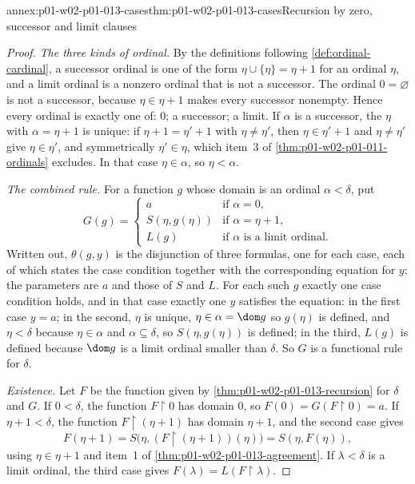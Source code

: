 \begin{annexitem}{annex:p01-w02-p01-013-cases}{thm:p01-w02-p01-013-cases}{Recursion by zero, successor and limit clauses}
\begin{proof}
\emph{The three kinds of ordinal.} By the definitions following
\cref{def:ordinal-cardinal}, a successor ordinal is one of the form
\(\eta\cup\{\eta\}=\eta+1\) for an ordinal \(\eta\), and a limit ordinal is a
nonzero ordinal that is not a successor. The ordinal \(0=\varnothing\) is not
a successor, because \(\eta\in\eta+1\) makes every successor nonempty. Hence
every ordinal is exactly one of: \(0\); a successor; a limit. If \(\alpha\)
is a successor, the \(\eta\) with \(\alpha=\eta+1\) is unique: if
\(\eta+1=\eta'+1\) with \(\eta\ne\eta'\), then \(\eta\in\eta'+1\) and
\(\eta\ne\eta'\) give \(\eta\in\eta'\), and symmetrically
\(\eta'\in\eta\), which item~3 of \cref{thm:p01-w02-p01-011-ordinals}
excludes. In that case \(\eta\in\alpha\), so \(\eta<\alpha\).

\emph{The combined rule.} For a function \(g\) whose domain is an ordinal
\(\alpha<\delta\), put
\[
  G(g)=
  \begin{cases}
    a & \text{if }\alpha=0,\\
    S(\eta,g(\eta)) & \text{if }\alpha=\eta+1,\\
    L(g) & \text{if }\alpha\text{ is a limit ordinal.}
  \end{cases}
\]
Written out, \(\theta(g,y)\) is the disjunction of three formulas, one for
each case, each of which states the case condition together with the
corresponding equation for \(y\); the parameters are \(a\) and those of
\(S\) and \(L\). For each such \(g\) exactly one case condition holds, and
in that case exactly one \(y\) satisfies the equation: in the first case
\(y=a\); in the second, \(\eta\) is unique, \(\eta\in\alpha=\dom g\) so
\(g(\eta)\) is defined, and \(\eta<\delta\) because \(\eta\in\alpha\) and
\(\alpha\subseteq\delta\), so \(S(\eta,g(\eta))\) is defined; in the third,
\(L(g)\) is defined because \(\dom g\) is a limit ordinal smaller than
\(\delta\). So \(G\) is a functional rule for \(\delta\).

\emph{Existence.} Let \(F\) be the function given by
\cref{thm:p01-w02-p01-013-recursion} for \(\delta\) and \(G\). If
\(0<\delta\), the function \(F\mathbin{\upharpoonright}0\) has domain \(0\),
so \(F(0)=G(F\mathbin{\upharpoonright}0)=a\). If \(\eta+1<\delta\), the
function \(F\mathbin{\upharpoonright}(\eta+1)\) has domain \(\eta+1\), and
the second case gives
\[
  F(\eta+1)=S\bigl(\eta,(F\mathbin{\upharpoonright}(\eta+1))(\eta)\bigr)
  =S(\eta,F(\eta)),
\]
using \(\eta\in\eta+1\) and item~1 of
\cref{thm:p01-w02-p01-013-agreement}. If \(\lambda<\delta\) is a limit
ordinal, the third case gives
\(F(\lambda)=L(F\mathbin{\upharpoonright}\lambda)\).


\end{proof}
\end{annexitem}
